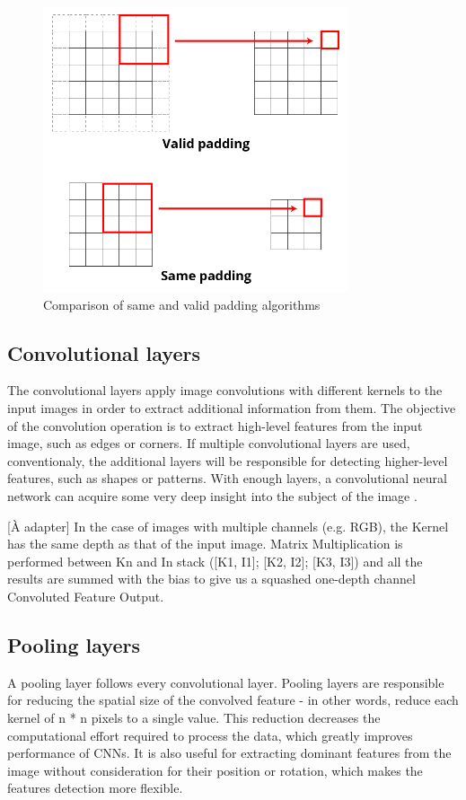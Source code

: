 \documentclass[12pt,a4paper,notitlepage]{article}
\begin{document}
\begin{figure}[htbp]
	\centering
		\includegraphics[width=0.80\textwidth]{images/padding-illustration.png}
	\caption{Comparison of same and valid padding algorithms}
	\label{fig:padding-illustration}
\end{figure}

\subsection{Convolutional layers}
The convolutional layers apply image convolutions with different kernels to the input images in order to extract additional information from them. The objective of the convolution operation is to extract high-level features from the input image, such as edges or corners. If multiple convolutional layers are used, conventionaly, the additional layers will be responsible for detecting higher-level features, such as shapes or patterns. With enough layers, a convolutional neural network can acquire some very deep insight into the subject of the image \cite{saha_comprehensive_2018}.

[À adapter] In the case of images with multiple channels (e.g. RGB), the Kernel has the same depth as that of the input image. Matrix Multiplication is performed between Kn and In stack ([K1, I1]; [K2, I2]; [K3, I3]) and all the results are summed with the bias to give us a squashed one-depth channel Convoluted Feature Output.

\subsection{Pooling layers}
A pooling layer follows every convolutional layer. Pooling layers are responsible for reducing the spatial size of the convolved feature - in other words, reduce each kernel of n * n pixels to a single value. This reduction decreases the computational effort required to process the data, which greatly improves performance of CNNs. It is also useful for extracting dominant features from the image without consideration for their position or rotation, which makes the features detection more flexible.
\end{document}
